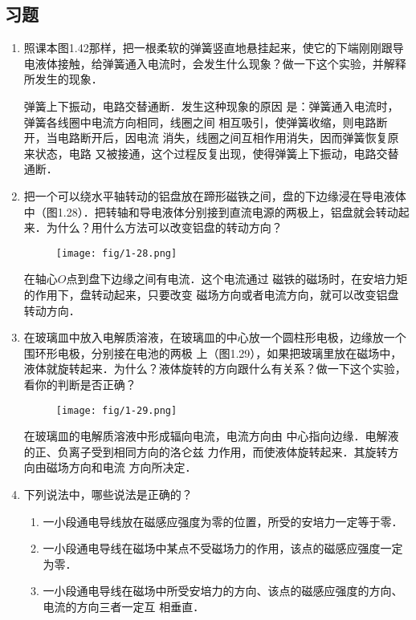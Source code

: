 \subsection{习题}
\begin{enumerate}
    \item 照课本图1.42那样，把一根柔软的弹簧竖直地悬挂起来，使它的下端刚刚跟导电液体接触，给弹簧通入电流时，会发生什么现象？做一下这个实验，并解释所发生的现象．

\begin{solution}
    弹簧上下振动，电路交替通断．发生这种现象的原因
    是：弹簧通入电流时，弹簧各线圈中电流方向相同，线圈之间
    相互吸引，使弹簧收缩，则电路断开，当电路断开后，因电流
    消失，线圈之间互相作用消失，因而弹簧恢复原来状态，电路
    又被接通，这个过程反复出现，使得弹簧上下振动，电路交替
    通断．
\end{solution}

    \item 把一个可以绕水平轴转动的铝盘放在蹄形磁铁之间，盘的下边缘浸在导电液体中（图1.28）．把转轴和导电液体分别接到直流电源的两极上，铝盘就会转动起来．为什么？用什么方法可以改变铝盘的转动方向？

\begin{figure}[htp]
\centering
	\texttt{[image: fig/1-28.png]}
\caption{}
\end{figure}

    \begin{solution}
        在轴心$O$点到盘下边缘之间有电流．这个电流通过
        磁铁的磁场时，在安培力矩的作用下，盘转动起来，只要改变
        磁场方向或者电流方向，就可以改变铝盘转动方向．
    \end{solution}
    
\item 在玻璃皿中放入电解质溶液，在玻璃皿的中心放一个圆柱形电极，边缘放一个围环形电极，分别接在电池的两极
上（图1.29），如果把玻璃里放在磁场中，液体就旋转起来．为什么？液体旋转的方向跟什么有关系？做一下这个实验，看你的判断是否正确？
\begin{figure}[htp]\centering
	\texttt{[image: fig/1-29.png]}
	\caption{ }
\end{figure}


\begin{solution}
    在玻璃皿的电解质溶液中形成辐向电流，电流方向由
    中心指向边缘．电解液的正、负离子受到相同方向的洛仑兹
    力作用，而使液体旋转起来．其旋转方向由磁场方向和电流
    方向所决定．
\end{solution}

\item 下列说法中，哪些说法是正确的？
\begin{enumerate}
    \item 一小段通电导线放在磁感应强度为零的位置，所受的安培力一定等于零．
    \item 一小段通电导线在磁场中某点不受磁场力的作用，该点的磁感应强度一定为零．
    \item 一小段通电导线在磁场中所受安培力的方向、该点的磁感应强度的方向、电流的方向三者一定互
相垂直．
\end{enumerate}


\end{enumerate}
